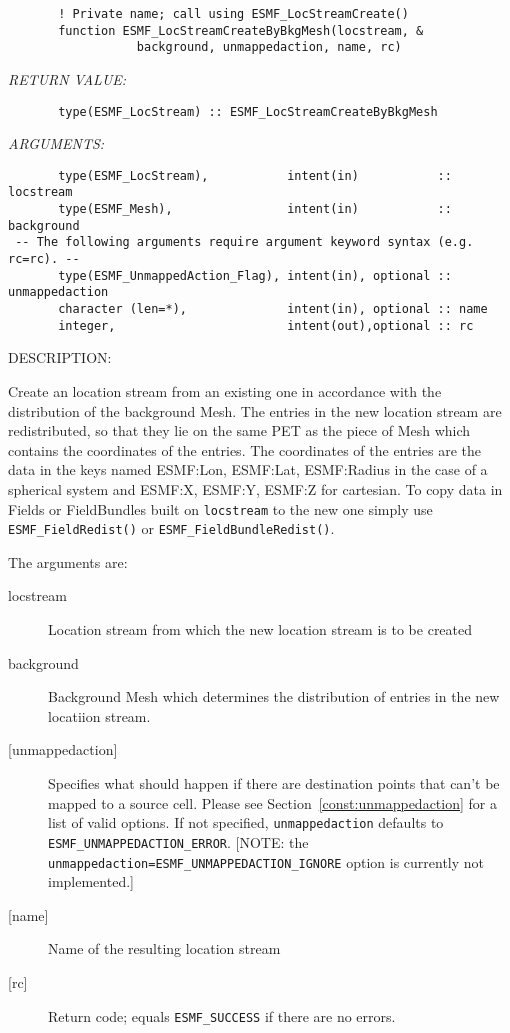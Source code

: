  
\begin{verbatim}       ! Private name; call using ESMF_LocStreamCreate()
       function ESMF_LocStreamCreateByBkgMesh(locstream, &
                  background, unmappedaction, name, rc)
 \end{verbatim}{\em RETURN VALUE:}
\begin{verbatim}       type(ESMF_LocStream) :: ESMF_LocStreamCreateByBkgMesh
 \end{verbatim}{\em ARGUMENTS:}
\begin{verbatim}       type(ESMF_LocStream),           intent(in)           :: locstream
       type(ESMF_Mesh),                intent(in)           :: background
 -- The following arguments require argument keyword syntax (e.g. rc=rc). --
       type(ESMF_UnmappedAction_Flag), intent(in), optional :: unmappedaction
       character (len=*),              intent(in), optional :: name
       integer,                        intent(out),optional :: rc\end{verbatim}
{\sf DESCRIPTION:\\ }


  
       Create an location stream from an existing one in accordance with 
       the distribution of the background Mesh.  The entries
       in the new location stream are redistributed, so that they lie on the same PET
       as the piece of Mesh which contains the coordinates of the entries. The coordinates
       of the entries are the data in the keys named ESMF:Lon, ESMF:Lat, ESMF:Radius in the 
       case of a spherical system and ESMF:X, ESMF:Y, ESMF:Z for cartesian. To copy data in
       Fields or FieldBundles built on {\tt locstream} to the new one simply use {\tt ESMF\_FieldRedist()}
       or {\tt ESMF\_FieldBundleRedist()}.
  
       The arguments are:
       \begin{description}
        \item[locstream]
            Location stream from which the new location stream is to be created
        \item[background]
            Background Mesh which determines the distribution of entries in the new locatiion stream.
       \item [{[unmappedaction]}]
             Specifies what should happen if there are destination points that
             can't be mapped to a source cell. Please see Section~\ref{const:unmappedaction} for a 
             list of valid options. If not specified, {\tt unmappedaction} defaults to {\tt ESMF\_UNMAPPEDACTION\_ERROR}. [NOTE: the {\tt unmappedaction=ESMF\_UNMAPPEDACTION\_IGNORE} option is currently not implemented.]
        \item[{[name]}]
            Name of the resulting location stream
        \item[{[rc]}]
            Return code; equals {\tt ESMF\_SUCCESS} if there are no errors.
       \end{description}
   
